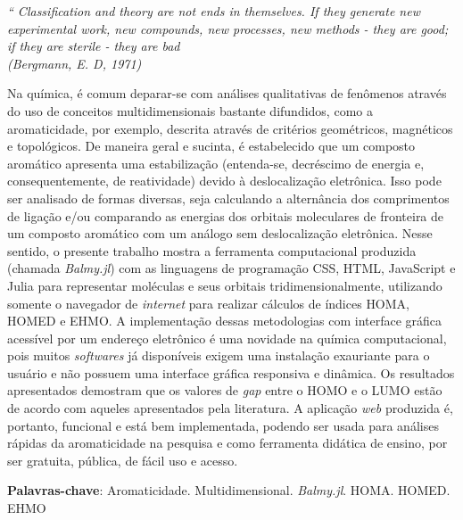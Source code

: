 \begin{epigrafe}
	\vspace*{\fill}
	\begin{flushright}
		\textit{``
		Classification and theory are not ends in themselves. If they generate new experimental work, new compounds, new processes, new methods - they are good;
		if they are sterile - they are bad  \\
		(Bergmann, E. D, 1971)}
	\end{flushright}
\end{epigrafe}


\setlength{\absparsep}{18pt} %
\begin{resumo}
	\SingleSpacing
    Na química, é comum deparar-se com análises qualitativas de fenômenos através do uso de conceitos multidimensionais bastante difundidos, como a aromaticidade, por exemplo, descrita através de critérios geométricos, magnéticos e topológicos. De maneira geral e sucinta, é estabelecido que um composto aromático apresenta uma estabilização (entenda-se, decréscimo de energia e, consequentemente, de reatividade) devido à deslocalização eletrônica. Isso pode ser analisado de formas diversas, seja calculando a alternância dos comprimentos de ligação e/ou comparando as energias dos orbitais moleculares de fronteira de um composto aromático com um análogo sem deslocalização eletrônica. Nesse sentido, o presente trabalho mostra a ferramenta computacional produzida (chamada \textit{Balmy.jl}) com as linguagens de programação \gls{CSS}, \gls{HTML}, JavaScript e Julia para representar moléculas e seus orbitais tridimensionalmente, utilizando somente o navegador de \textit{internet} para realizar cálculos de índices \gls{HOMA}, \gls{HOMED} e \gls{EHMO}. A implementação dessas metodologias com interface gráfica acessível por um endereço eletrônico é uma novidade na química computacional, pois muitos \textit{softwares} já disponíveis exigem uma instalação exauriante para o usuário e não possuem uma interface gráfica responsiva e dinâmica. Os resultados apresentados demostram que os valores de \textit{gap} entre o \gls{HOMO} e o \gls{LUMO} estão de acordo com aqueles apresentados pela literatura. A aplicação \textit{web} produzida é, portanto, funcional e está bem implementada, podendo ser usada para análises rápidas da aromaticidade na pesquisa e como ferramenta didática de ensino, por ser gratuita, pública, de fácil uso e acesso.
	
	\textbf{Palavras-chave}: Aromaticidade. Multidimensional. \textit{Balmy.jl}. \gls{HOMA}. \gls{HOMED}. \gls{EHMO}
\end{resumo}

